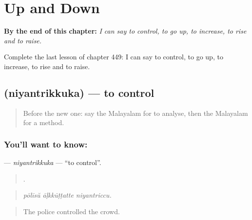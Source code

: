 
\chapter{Up and Down}
\label{ch:ml-up-and-down}

\begin{chapteropening}
\textbf{By the end of this chapter:} \emph{I can say to control, to go up, to increase, to rise and to raise.}

Complete the last lesson of chapter 449: I can say to control, to go up, to increase, to rise and to raise.
\end{chapteropening}

\section[\texorpdfstring{\ml{നിയന്ത്രിക്കുക} (niyantrikkuka)}{നിയന്ത്രിക്കുക (niyantrikkuka)}]{ (niyantrikkuka) — to control}

\label{lesson:ML-C449-niyantrikkuka}



\begin{quote}
Before the new one: say the Malayalam for to analyse, then the Malayalam for a method.
\end{quote}

\subsection*{You'll want to know: }
\textbf{} — \emph{niyantrikkuka} — \textquotedblleft{}to control\textquotedblright{}.

\begin{quote}
  .
\end{quote}

\begin{quote}
\emph{pōlīsŭ āḷkkūṭṭatte niyantriccu.}
\end{quote}

\begin{quote}
The police controlled the crowd.
\end{quote}

